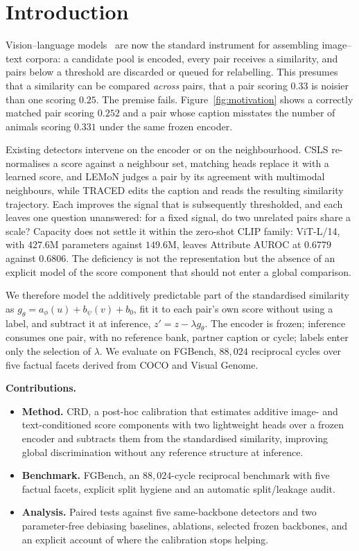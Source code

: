 \section{Introduction}
\label{sec:intro}

Vision--language models~\cite{radford2021clip,li2022blip} are now the standard
instrument for assembling image--text corpora: a candidate pool is encoded, every
pair receives a similarity, and pairs below a threshold are discarded or queued for
relabelling. This presumes that a similarity can be compared \emph{across} pairs,
that a pair scoring $0.33$ is noisier than one scoring $0.25$. The premise fails.
Figure~\ref{fig:motivation} shows a correctly matched pair scoring $0.252$ and a
pair whose caption misstates the number of animals scoring $0.331$ under the same
frozen encoder.

Existing detectors intervene on the encoder or on the neighbourhood. CSLS
re-normalises a score against a neighbour set, matching heads replace it with a
learned score, and LEMoN judges a pair by its agreement with multimodal neighbours,
while TRACED edits the caption and reads the resulting similarity trajectory. Each improves the signal that is subsequently
thresholded, and each leaves one question unanswered: for a fixed signal, do two
unrelated pairs share a scale? Capacity does not settle it within the zero-shot CLIP
family: ViT-L/14, with $427.6$M parameters against $149.6$M, leaves Attribute AUROC
at $0.6779$ against $0.6806$. The deficiency is not the representation but the
absence of an explicit model of the score component that should not enter a global
comparison.

We therefore model the additively predictable part of the standardised similarity
as $g_\theta=a_\phi(u)+b_\psi(v)+b_0$, fit it to each pair's own score without using
a label, and subtract it at inference, $z'=z-\lambda g_\theta$. The
encoder is frozen; inference consumes one pair, with no reference bank, partner
caption or cycle; labels enter only the selection of $\lambda$. We evaluate on
FGBench, $88{,}024$ reciprocal cycles over five factual facets derived from COCO and
Visual Genome.

\noindent\textbf{Contributions.}
\begin{itemize}
  \item \textbf{Method.} CRD, a post-hoc calibration that estimates additive
  image- and text-conditioned score components with two lightweight heads over a
  frozen encoder and subtracts them from the standardised similarity, improving
  global discrimination without any reference structure at inference.
  \item \textbf{Benchmark.} FGBench, an $88{,}024$-cycle reciprocal benchmark with
  five factual facets, explicit split hygiene and an automatic split/leakage audit.
  \item \textbf{Analysis.} Paired tests against five same-backbone detectors and two
  parameter-free debiasing baselines, ablations, selected frozen backbones, and an
  explicit account of where the calibration stops helping.
\end{itemize}
